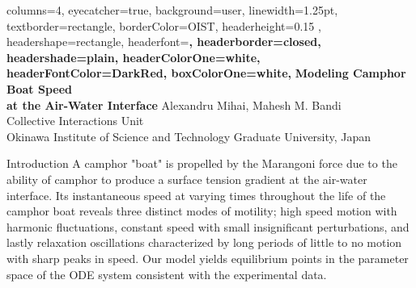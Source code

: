 \documentclass[
    a0paper, %
    portrait, %
    fontscale=0.28 %
    ]{baposter}
\begin{document}
\begin{poster}{ %
    columns=4, %
    eyecatcher=true, %
    background=user, %
    linewidth=1.25pt, %
    textborder=rectangle, %
    borderColor=OIST, %
    headerheight=0.15 \textheight, %
    headershape=rectangle, %
    headerfont=\large \sf \bf, %
    headerborder=closed, %
    headershade=plain, %
    headerColorOne=white, %
    headerFontColor=DarkRed, %
    boxColorOne=white, %
} 
{} %
{\color{OIST}\Huge
 \textbf{Modeling Camphor Boat Speed \\ at the Air-Water Interface}
}
{ \vspace{1em} 
  Alexandru Mihai, Mahesh M. Bandi\\[0.5em]
  \small
  Collective Interactions Unit \\
  Okinawa Institute of Science and Technology Graduate University, Japan
  \vspace{3em} 
}

\begin{posterbox}[name=intro,column=0,span=4, row=0]{Introduction}
A camphor "boat" is propelled by the Marangoni force due to the ability of camphor to produce a surface tension gradient at the air-water interface. Its instantaneous speed at varying times throughout the life of the camphor boat reveals three distinct modes of motility; high speed motion with harmonic fluctuations, constant speed with small insignificant perturbations, and lastly relaxation oscillations characterized by long periods of little to no motion with sharp peaks in speed. Our model yields equilibrium points in the parameter space of the ODE system consistent with the experimental data. 
\end{posterbox}



\end{poster}
\end{document}
